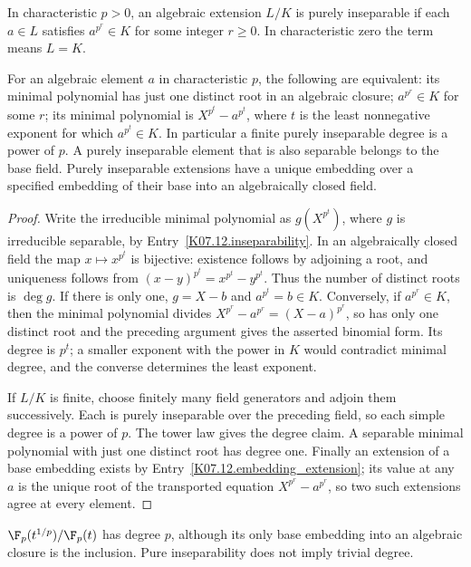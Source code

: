 \begin{definition}
In characteristic $p>0$, an algebraic extension $L/K$ is purely inseparable if each $a\in L$ satisfies $a^{p^r}\in K$ for some integer $r\geq0$. In characteristic zero the term means $L=K$.
\end{definition}
\begin{proposition}
For an algebraic element $a$ in characteristic $p$, the following are equivalent: its minimal polynomial has just one distinct root in an algebraic closure; $a^{p^r}\in K$ for some $r$; its minimal polynomial is $X^{p^t}-a^{p^t}$, where $t$ is the least nonnegative exponent for which $a^{p^t}\in K$. In particular a finite purely inseparable degree is a power of $p$. A purely inseparable element that is also separable belongs to the base field. Purely inseparable extensions have a unique embedding over a specified embedding of their base into an algebraically closed field.
\end{proposition}
\begin{proof}
Write the irreducible minimal polynomial as $g(X^{p^t})$, where $g$ is irreducible separable, by Entry~\ref{K07.12.inseparability}. In an algebraically closed field the map $x\mapsto x^{p^t}$ is bijective: existence follows by adjoining a root, and uniqueness follows from $(x-y)^{p^t}=x^{p^t}-y^{p^t}$. Thus the number of distinct roots is $\deg g$. If there is only one, $g=X-b$ and $a^{p^t}=b\in K$. Conversely, if $a^{p^r}\in K$, then the minimal polynomial divides $X^{p^r}-a^{p^r}=(X-a)^{p^r}$, so has only one distinct root and the preceding argument gives the asserted binomial form. Its degree is $p^t$; a smaller exponent with the power in $K$ would contradict minimal degree, and the converse determines the least exponent.

If $L/K$ is finite, choose finitely many field generators and adjoin them successively. Each is purely inseparable over the preceding field, so each simple degree is a power of $p$. The tower law gives the degree claim. A separable minimal polynomial with just one distinct root has degree one. Finally an extension of a base embedding exists by Entry~\ref{K07.12.embedding_extension}; its value at any $a$ is the unique root of the transported equation $X^{p^r}-a^{p^r}$, so two such extensions agree at every element.
\end{proof}
\begin{example}
$\F_p(t^{1/p})/\F_p(t)$ has degree $p$, although its only base embedding into an algebraic closure is the inclusion. Pure inseparability does not imply trivial degree.
\end{example}

